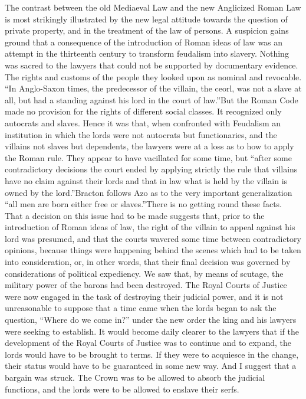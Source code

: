 \documentclass{book}
\begin{document}
The contrast between the old Mediaeval Law and the new Anglicized Roman Law is most strikingly illustrated by the new legal attitude towards the question of private property, and in the treatment of the law of persons. A suspicion gains ground that a consequence of the introduction of Roman ideas of law was an attempt in the thirteenth century to transform feudalism into slavery. Nothing was sacred to the lawyers that could not be supported by documentary evidence. The rights and customs of the people they looked upon as nominal and revocable. “In Anglo-Saxon times, the predecessor of the villain, the ceorl, was not a slave at all, but had a standing against his lord in the court of law.”\footnotemark[3] But the Roman Code made no provision for the rights of different social classes. It recognized only autocrats and slaves. Hence it was that, when confronted with Feudalism an institution in which the lords were not autocrats but functionaries, and the villains not slaves but dependents, the lawyers were at a loss as to how to apply the Roman rule. They appear to have vacillated for some time, but “after some contradictory decisions the court ended by applying strictly the rule that villains have no claim against their lords and that in law what is held by the villain is owned by the lord.”\footnotemark[4] Bracton follows Azo as to the very important generalization “all men are born either free or slaves.”\footnotemark[5] There is no getting round these facts. That a decision on this issue had to be made suggests that, prior to the introduction of Roman ideas of law, the right of the villain to appeal against his lord was presumed, and that the courts wavered some time between contradictory opinions, because things were happening behind the scenes which had to be taken into consideration, or, in other words, that their final decision was governed by considerations of political expediency. We saw that, by means of scutage, the military power of the barons had been destroyed. The Royal Courts of Justice were now engaged in the task of destroying their judicial power, and it is not unreasonable to suppose that a time came when the lords began to ask the question, “Where do we come in?” under the new order the king and his lawyers were seeking to establish. It would become daily clearer to the lawyers that if the development of the Royal Courts of Justice was to continue and to expand, the lords would have to be brought to terms. If they were to acquiesce in the change, their status would have to be guaranteed in some new way. And I suggest that a bargain was struck. The Crown was to be allowed to absorb the judicial functions, and the lords were to be allowed to enslave their serfs.
\end{document}
